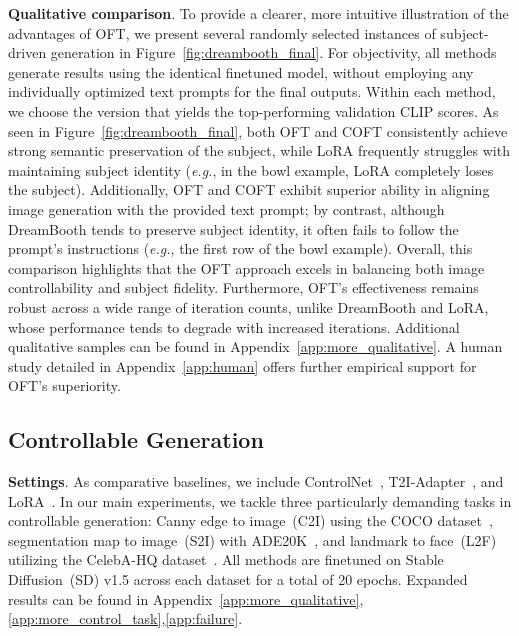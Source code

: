 \textbf{Qualitative comparison}. To provide a clearer, more intuitive illustration of the advantages of OFT, we present several randomly selected instances of subject-driven generation in Figure~\ref{fig:dreambooth_final}. For objectivity, all methods generate results using the identical finetuned model, without employing any individually optimized text prompts for the final outputs. Within each method, we choose the version that yields the top-performing validation CLIP scores. As seen in Figure~\ref{fig:dreambooth_final}, both OFT and COFT consistently achieve strong semantic preservation of the subject, while LoRA frequently struggles with maintaining subject identity (\emph{e.g.}, in the bowl example, LoRA completely loses the subject). Additionally, OFT and COFT exhibit superior ability in aligning image generation with the provided text prompt; by contrast, although DreamBooth tends to preserve subject identity, it often fails to follow the prompt's instructions (\emph{e.g.}, the first row of the bowl example). Overall, this comparison highlights that the OFT approach excels in balancing both image controllability and subject fidelity. Furthermore, OFT's effectiveness remains robust across a wide range of iteration counts, unlike DreamBooth and LoRA, whose performance tends to degrade with increased iterations. Additional qualitative samples can be found in Appendix~\ref{app:more_qualitative}. A human study detailed in Appendix~\ref{app:human} offers further empirical support for OFT's superiority.

\subsection{Controllable Generation}

\textbf{Settings}. As comparative baselines, we include ControlNet~\cite{zhang2023adding}, T2I-Adapter~\cite{mou2023t2i}, and LoRA~\cite{hulora2022}. In our main experiments, we tackle three particularly demanding tasks in controllable generation: Canny edge to image~(C2I) using the COCO dataset~\cite{lin2014microsoft}, segmentation map to image~(S2I) with ADE20K~\cite{zhou2017scene}, and landmark to face~(L2F) utilizing the CelebA-HQ dataset~\cite{karras2018progressive,xia2021tedigan}. All methods are finetuned on Stable Diffusion~(SD) v1.5 across each dataset for a total of 20 epochs. Expanded results can be found in Appendix~\ref{app:more_qualitative},\ref{app:more_control_task},\ref{app:failure}.

